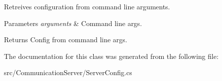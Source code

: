 Retreives configuration from command line arguments. 


\begin{DoxyParams}{Parameters}
{\em arguments} & Command line args.\\
\hline
\end{DoxyParams}
\begin{DoxyReturn}{Returns}
Config from command line args.
\end{DoxyReturn}


The documentation for this class was generated from the following file\+:\begin{DoxyCompactItemize}
\item 
src/\+Communication\+Server/Server\+Config.\+cs\end{DoxyCompactItemize}
